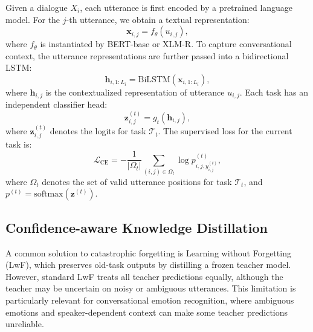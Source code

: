 Given a dialogue $X_i$, each utterance is first encoded by a pretrained language model. For the $j$-th utterance, we obtain a textual representation:
\begin{equation}
    \mathbf{x}_{i,j} = f_{\theta}(u_{i,j}),
\end{equation}
where $f_{\theta}$ is instantiated by BERT-base or XLM-R. To capture conversational context, the utterance representations are further passed into a bidirectional LSTM:
\begin{equation}
    \mathbf{h}_{i,1:L_i} = \mathrm{BiLSTM}(\mathbf{x}_{i,1:L_i}),
\end{equation}
where $\mathbf{h}_{i,j}$ is the contextualized representation of utterance $u_{i,j}$. Each task has an independent classifier head:
\begin{equation}
    \mathbf{z}^{(t)}_{i,j} = g_t(\mathbf{h}_{i,j}),
\end{equation}
where $\mathbf{z}^{(t)}_{i,j}$ denotes the logits for task $\mathcal{T}_t$. The supervised loss for the current task is:
\begin{equation}
    \mathcal{L}_{\mathrm{CE}} =
    - \frac{1}{|\Omega_t|}\sum_{(i,j)\in\Omega_t}
    \log p^{(t)}_{i,j,y_{i,j}^{(t)}},
\end{equation}
where $\Omega_t$ denotes the set of valid utterance positions for task $\mathcal{T}_t$, and $p^{(t)}=\mathrm{softmax}(\mathbf{z}^{(t)})$.

\subsection{Confidence-aware Knowledge Distillation}
\label{subsec:confidence_kd}

A common solution to catastrophic forgetting is Learning without Forgetting (LwF), which preserves old-task outputs by distilling a frozen teacher model. However, standard LwF treats all teacher predictions equally, although the teacher may be uncertain on noisy or ambiguous utterances. This limitation is particularly relevant for conversational emotion recognition, where ambiguous emotions and speaker-dependent context can make some teacher predictions unreliable.


